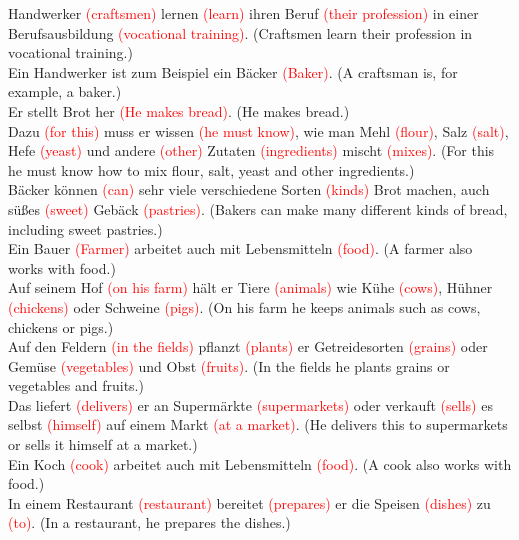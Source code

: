 \documentclass{article}
\begin{document}
\begin{enumerate}
    Handwerker \textcolor{red}{(craftsmen)} lernen \textcolor{red}{(learn)} ihren Beruf \textcolor{red}{(their profession)} in einer Berufsausbildung \textcolor{red}{(vocational training)}. (Craftsmen learn their profession in vocational training.) \\
    Ein Handwerker ist zum Beispiel ein Bäcker \textcolor{red}{(Baker)}. (A craftsman is, for example, a baker.) \\
    Er stellt Brot her \textcolor{red}{(He makes bread)}. (He makes bread.) \\
    Dazu \textcolor{red}{(for this)} muss er wissen \textcolor{red}{(he must know)}, wie man Mehl \textcolor{red}{(flour)}, Salz \textcolor{red}{(salt)}, Hefe \textcolor{red}{(yeast)} und andere \textcolor{red}{(other)} Zutaten \textcolor{red}{(ingredients)} mischt \textcolor{red}{(mixes)}. (For this he must know how to mix flour, salt, yeast and other ingredients.) \\
    Bäcker können \textcolor{red}{(can)} sehr viele verschiedene Sorten \textcolor{red}{(kinds)} Brot machen, auch süßes \textcolor{red}{(sweet)} Gebäck \textcolor{red}{(pastries)}. (Bakers can make many different kinds of bread, including sweet pastries.) \\
    Ein Bauer \textcolor{red}{(Farmer)} arbeitet auch mit Lebensmitteln \textcolor{red}{(food)}. (A farmer also works with food.) \\
    Auf seinem Hof \textcolor{red}{(on his farm)} hält er Tiere \textcolor{red}{(animals)} wie Kühe \textcolor{red}{(cows)}, Hühner \textcolor{red}{(chickens)} oder Schweine \textcolor{red}{(pigs)}. (On his farm he keeps animals such as cows, chickens or pigs.) \\
    Auf den Feldern \textcolor{red}{(in the fields)} pflanzt \textcolor{red}{(plants)} er Getreidesorten \textcolor{red}{(grains)} oder Gemüse \textcolor{red}{(vegetables)} und Obst \textcolor{red}{(fruits)}. (In the fields he plants grains or vegetables and fruits.) \\
    Das liefert \textcolor{red}{(delivers)} er an Supermärkte \textcolor{red}{(supermarkets)} oder verkauft \textcolor{red}{(sells)} es selbst \textcolor{red}{(himself)} auf einem Markt \textcolor{red}{(at a market)}. (He delivers this to supermarkets or sells it himself at a market.) \\
    Ein Koch \textcolor{red}{(cook)} arbeitet auch mit Lebensmitteln \textcolor{red}{(food)}. (A cook also works with food.) \\
    In einem Restaurant \textcolor{red}{(restaurant)} bereitet \textcolor{red}{(prepares)} er die Speisen \textcolor{red}{(dishes)} zu \textcolor{red}{(to)}. (In a restaurant, he prepares the dishes.) \\

\end{enumerate}
\end{document}
